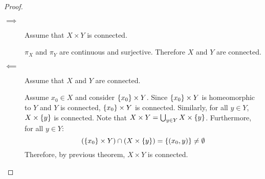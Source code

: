 \documentclass[letterpaper,12pt,fleqn]{article}
\begin{document}
\begin{proof}
  \begin{description}
  \item[]
  \item[\(\implies\)] Assume that \(X\times Y\) is connected.

    \(\pi_X\) and \(\pi_Y\) are continuous and surjective.  Therefore \(X\) and \(Y\) are connected.

  \item[\(\impliedby\)] Assume that \(X\) and \(Y\) are connected.

    Assume \(x_0\in X\) and consider \(\{x_0\}\times Y\).  Since \(\{x_0\}\times Y\) is homeomorphic to \(Y\) and
    \(Y\) is connected, \(\{x_0\}\times Y\) is connected.  Similarly, for all \(y\in Y\), \(X\times\{y\}\) is
    connected.  Note that \(X\times Y=\bigcup_{y\in Y}X\times\{y\}\).  Furthermore, for all \(y\in Y\):
    \[(\{x_0\}\times Y)\cap(X\times\{y\})=\{(x_0,y)\}\ne\emptyset\]
    Therefore, by previous theorem, \(X\times Y\) is connected.
  \end{description}
\end{proof}
\end{document}
